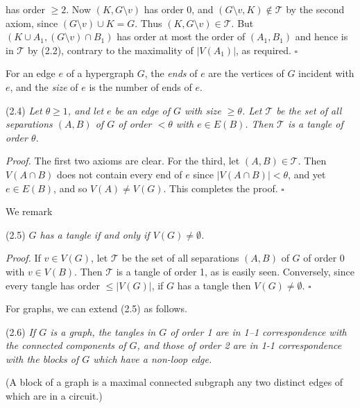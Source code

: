 \noindent has order $\ge 2$. Now $(K, G \setminus v)$ has order 0, and $(G \setminus v, K) \notin \mathscr{T}$ by the second axiom, since $(G \setminus v) \cup K = G$. Thus $(K, G \setminus v) \in \mathscr{T}$. But $(K \cup A_1, (G \setminus v) \cap B_1)$ has order at most the order of $(A_1, B_1)$ and hence is in $\mathscr{T}$ by (2.2), contrary to the maximality of $|V(A_1)|$, as required. $\square$

For an edge $e$ of a hypergraph $G$, the \textit{ends} of $e$ are the vertices of $G$ incident with $e$, and the \textit{size} of $e$ is the number of ends of $e$.

\stmt
(2.4) \textit{Let $\theta \ge 1$, and let $e$ be an edge of $G$ with size $\ge \theta$. Let $\mathscr{T}$ be the set of all separations $(A, B)$ of $G$ of order $< \theta$ with $e \in E(B)$. Then $\mathscr{T}$ is a tangle of order $\theta$.}

\textit{Proof.} The first two axioms are clear. For the third, let $(A, B) \in \mathscr{T}$. Then $V(A \cap B)$ does not contain every end of $e$ since $|V(A \cap B)| < \theta$, and yet $e \in E(B)$, and so $V(A) \ne V(G)$. This completes the proof. $\square$

We remark

\stmt
(2.5) \textit{$G$ has a tangle if and only if $V(G) \ne \emptyset$.}

\textit{Proof.} If $v \in V(G)$, let $\mathscr{T}$ be the set of all separations $(A, B)$ of $G$ of order 0 with $v \in V(B)$. Then $\mathscr{T}$ is a tangle of order 1, as is easily seen. Conversely, since every tangle has order $\le |V(G)|$, if $G$ has a tangle then $V(G) \ne \emptyset$. $\square$

For graphs, we can extend (2.5) as follows.

\stmt
(2.6) \textit{If $G$ is a graph, the tangles in $G$ of order 1 are in 1--1 correspondence with the connected components of $G$, and those of order 2 are in 1-1 correspondence with the blocks of $G$ which have a non-loop edge.}

(A block of a graph is a maximal connected subgraph any two distinct edges of which are in a circuit.)

